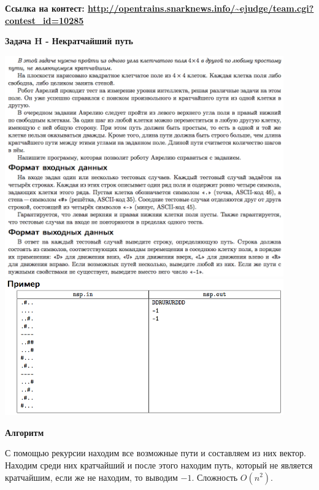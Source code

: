 \documentclass[a4paper,12pt]{article}
\begin{document}
\textbf{{\large Ссылка на контест: \url{http://opentrains.snarknews.info/~ejudge/team.cgi?contest_id=10285}}}

\newpage
\textbf{{\large Задача H - Некратчайший путь}}

\begin{center}
\includegraphics[width=0.9\textwidth]{OC_Peterhof/OC_Peterhof_H1.png}\\ [1cm]
\includegraphics[width=0.9\textwidth]{OC_Peterhof/OC_Peterhof_H2.png}\\ [1cm]
\end{center}
\newpage

\textbf{{\large Алгоритм}}

С помощью рекурсии находим все возможные пути и составляем из них вектор. Находим среди них кратчайший и после этого находим путь, который не является кратчайшим, если же не находим, то выводим $-1$. Сложность $O(n^2)$. \\
\end{document}
